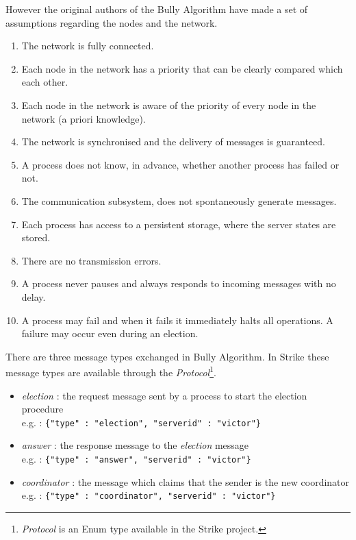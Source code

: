 \documentclass[dareport.tex]{subfiles}
\begin{document}
However the original authors of the Bully Algorithm have made a set of assumptions regarding the nodes and the network\cite{election}.
\begin{enumerate}\label{ba-assumptions}
	\item The network is fully connected.\label{assumption:1}
	\item Each node in the network has a priority that can be clearly compared which each other.\label{assumption:2}
	\item Each node in the network is aware of the priority of every node in the network (a priori knowledge).\label{assumption:3}
	\item The network is synchronised and the delivery of messages is guaranteed.\label{assumption:4}
	\item A process does not know, in advance, whether another process has failed or not.\label{assumption:5}
	\item The communication subsystem, does not spontaneously generate messages.\label{assumption:6}
	\item Each process has access to a persistent storage, where the server states are stored.\label{assumption:7}
	\item There are no transmission errors.\label{assumption:8}
	\item A process never pauses and always responds to incoming messages with no delay.\label{assumption:9}
	\item A process may fail and when it fails it immediately halts all operations. A failure may occur even during an election.\label{assumption:10}
\end{enumerate}
There are three message types exchanged in Bully Algorithm. In Strike these message types are available through the \emph{Protocol}\footnote{\emph{Protocol} is an Enum type available in the Strike project.}.
\begin{itemize}\label{ba-message-types}
	\item \emph{election} : the request message sent by a process to start the election procedure\\
	e.g. : \verb|{"type" : "election", "serverid" : "victor"}|
	\item \emph{answer} : the response message to the \emph{election} message\\
	e.g. : \verb|{"type" : "answer", "serverid" : "victor"}|
	\item \emph{coordinator} : the message which claims that the sender is the new coordinator\\
	e.g. : \verb|{"type" : "coordinator", "serverid" : "victor"}|
\end{itemize}
\end{document}
